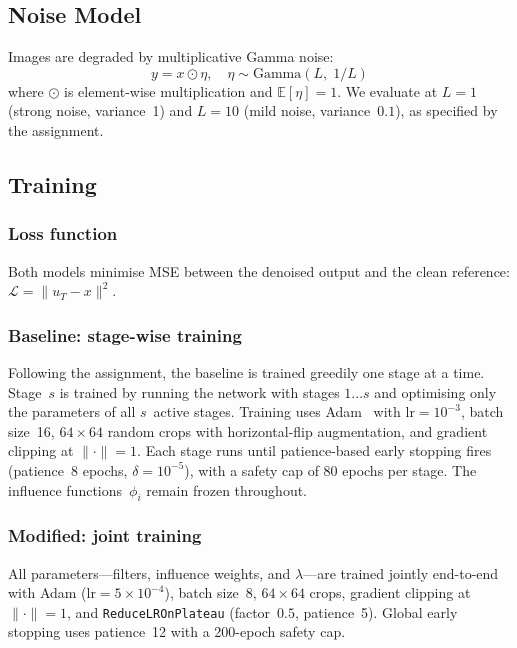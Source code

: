 \documentclass[10pt,conference]{IEEEtran}
\begin{document}
\subsection{Noise Model}

Images are degraded by multiplicative Gamma noise:
\begin{equation}
y = x \odot \eta, \quad \eta \sim \text{Gamma}(L,\; 1/L)
\end{equation}
where $\odot$ is element-wise multiplication and $\mathbb{E}[\eta]{=}1$.  We
evaluate at $L{=}1$ (strong noise, variance~1) and $L{=}10$ (mild noise,
variance~$0.1$), as specified by the assignment.

\subsection{Training}

\subsubsection{Loss function}
Both models minimise MSE between the denoised output and the clean reference:
$\mathcal{L} = \|u_T - x\|^2$.

\subsubsection{Baseline: stage-wise training}
Following the assignment, the baseline is trained greedily one stage at a time.
Stage~$s$ is trained by running the network with stages $1 \ldots s$ and
optimising only the parameters of all $s$~active stages.  Training uses
Adam~\cite{kingma2014} with $\text{lr}{=}10^{-3}$, batch size~16, $64{\times}64$
random crops with horizontal-flip augmentation, and gradient clipping at
$\|\cdot\|{=}1$.  Each stage runs until patience-based early stopping fires
(patience~8 epochs, $\delta{=}10^{-5}$), with a safety cap of 80 epochs per
stage.  The influence functions~$\phi_i$ remain frozen throughout.

\subsubsection{Modified: joint training}
All parameters---filters, influence weights, and $\lambda$---are trained
jointly end-to-end with Adam ($\text{lr}{=}5{\times}10^{-4}$), batch size~8,
$64{\times}64$ crops, gradient clipping at $\|\cdot\|{=}1$, and
\texttt{ReduceLROnPlateau} (factor~$0.5$, patience~5).  Global early stopping
uses patience~12 with a 200-epoch safety cap.
\end{document}
